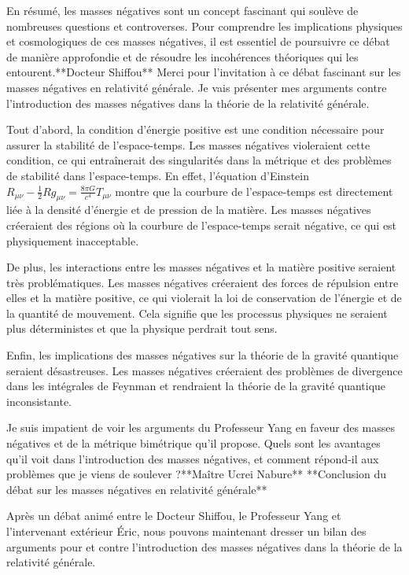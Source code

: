 En résumé, les masses négatives sont un concept fascinant qui soulève de nombreuses questions et controverses. Pour comprendre les implications physiques et cosmologiques de ces masses négatives, il est essentiel de poursuivre ce débat de manière approfondie et de résoudre les incohérences théoriques qui les entourent.**Docteur Shiffou**
Merci pour l'invitation à ce débat fascinant sur les masses négatives en relativité générale. Je vais présenter mes arguments contre l'introduction des masses négatives dans la théorie de la relativité générale.

Tout d'abord, la condition d'énergie positive est une condition nécessaire pour assurer la stabilité de l'espace-temps. Les masses négatives violeraient cette condition, ce qui entraînerait des singularités dans la métrique et des problèmes de stabilité dans l'espace-temps. En effet, l'équation d'Einstein $R_{\mu\nu} - \frac{1}{2}Rg_{\mu\nu} = \frac{8\pi G}{c^4}T_{\mu\nu}$ montre que la courbure de l'espace-temps est directement liée à la densité d'énergie et de pression de la matière. Les masses négatives créeraient des régions où la courbure de l'espace-temps serait négative, ce qui est physiquement inacceptable.

De plus, les interactions entre les masses négatives et la matière positive seraient très problématiques. Les masses négatives créeraient des forces de répulsion entre elles et la matière positive, ce qui violerait la loi de conservation de l'énergie et de la quantité de mouvement. Cela signifie que les processus physiques ne seraient plus déterministes et que la physique perdrait tout sens.

Enfin, les implications des masses négatives sur la théorie de la gravité quantique seraient désastreuses. Les masses négatives créeraient des problèmes de divergence dans les intégrales de Feynman et rendraient la théorie de la gravité quantique inconsistante.

Je suis impatient de voir les arguments du Professeur Yang en faveur des masses négatives et de la métrique bimétrique qu'il propose. Quels sont les avantages qu'il voit dans l'introduction des masses négatives, et comment répond-il aux problèmes que je viens de soulever ?**Maître Ucrei Nabure**
**Conclusion du débat sur les masses négatives en relativité générale**

Après un débat animé entre le Docteur Shiffou, le Professeur Yang et l'intervenant extérieur Éric, nous pouvons maintenant dresser un bilan des arguments pour et contre l'introduction des masses négatives dans la théorie de la relativité générale.

